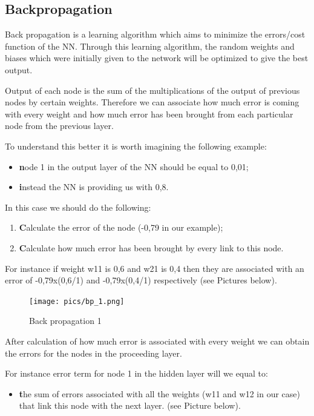 \subsection{Backpropagation}

Back propagation is a learning algorithm which aims to minimize the errors/cost function of the NN. Through this learning algorithm, the random weights and biases which were initially given to the network will be optimized to give the best output.

Output of each node is the sum of the multiplications of the output of previous nodes by certain weights. Therefore we can associate how much error is coming with every weight and how much error has been brought from each particular node from the previous layer.

To understand this better it is worth imagining the following example:
\begin{itemize}
   \item \textbf node 1 in the output layer of the NN should be equal to 0,01;
   \item \textbf instead the NN is providing us with 0,8.
\end{itemize}

In this case we should do the following:
\begin{enumerate}
   \item \textbf Calculate the error of the node (-0,79 in our example);
   \item \textbf Calculate how much error has been brought by every link to this node.
\end{enumerate}

For instance if weight w11 is 0,6 and w21 is 0,4 then they are associated with an error of -0,79x(0,6/1) and -0,79x(0,4/1) respectively (see Pictures below).

\begin{figure}[H]
    \texttt{[image: pics/bp\_1.png]}
    \caption{\label{fig:bp} Back propagation 1}
\end{figure}

After calculation of how much error is associated with every weight we can obtain the errors for the nodes in the proceeding layer.
 
For instance error term for node 1 in the hidden layer will we equal to:
\begin{itemize}
   \item \textbf the sum of errors associated with all the weights (w11 and w12 in our case) that link this node with the next layer. (see Picture below).
\end{itemize}

